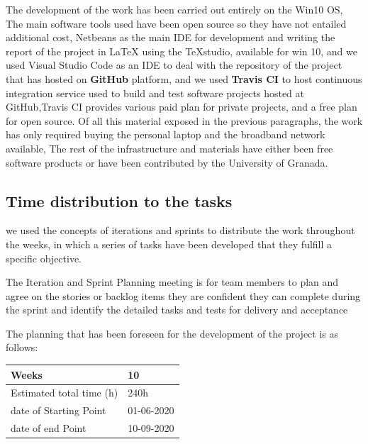 The development of the work has been carried out entirely on the Win10 OS, The main software tools used have been open source so they have not entailed additional cost, Netbeans as the main IDE for development and writing the report of the project in LaTeX using the TeXstudio, available for win 10, and  we used  Visual Studio Code as an IDE to deal with the repository of the project that has hosted on \textbf{GitHub} \cite{MyProject} platform, and we used \textbf{Travis CI} \cite{travis_CI} to host continuous integration service used to build and test software projects hosted at GitHub,Travis CI provides various paid plan for private projects, and a free plan for open source.
Of all this material exposed in the previous paragraphs, the work has only required buying the personal laptop and the broadband network available, The rest of the infrastructure and materials have either been free software products or have been contributed by the University of Granada.

\subsection{Time distribution to the tasks}
we used the concepts of iterations and sprints to distribute the work throughout the weeks, in which a series of tasks have been developed that they fulfill a specific objective.

The Iteration and Sprint Planning meeting is for team members to plan and agree on the stories or backlog items they are confident they can complete during the sprint and identify the detailed tasks and tests for delivery and acceptance

The planning that has been foreseen for the development of the project is as follows:

\begin{table}[h!]
    \centering
    \begin{tabular}{|p{5cm}|p{4cm}|}
     \hline
        \cellcolor[gray]{0.9} Weeks  & 10 \\ \hline
        \cellcolor[gray]{0.9} Estimated total time (h)  & 240h \\ \hline
        \cellcolor[gray]{0.9} date of Starting Point  & 01-06-2020 \\ \hline
        \cellcolor[gray]{0.9} date of end Point   & 10-09-2020 \\ \hline
            
    \end{tabular}
    \end{table}

